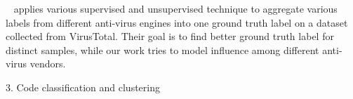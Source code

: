 ~\citet{betterGT} applies various supervised and unsupervised 
technique to aggregate various labels from different anti-virus engines into one ground truth label 
on a dataset collected from VirusTotal. 
Their goal is to find better ground truth label for distinct samples, 
while our work tries to model influence among different anti-virus vendors.  

3. Code classification and clustering

